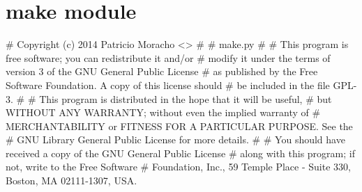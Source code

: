 \documentclass[a4paper,12pt,spanish]{sphinxmanual}
\begin{document}
\section{make module}
\label{\detokenize{make:module-make}}\label{\detokenize{make:make-module}}\label{\detokenize{make::doc}}
\# Copyright (c) 2014 Patricio Moracho \textless{}\textgreater{}
\#
\# make.py
\#
\# This program is free software; you can redistribute it and/or
\# modify it under the terms of version 3 of the GNU General Public License
\# as published by the Free Software Foundation. A copy of this license should
\# be included in the file GPL-3.
\#
\# This program is distributed in the hope that it will be useful,
\# but WITHOUT ANY WARRANTY; without even the implied warranty of
\# MERCHANTABILITY or FITNESS FOR A PARTICULAR PURPOSE.  See the
\# GNU Library General Public License for more details.
\#
\# You should have received a copy of the GNU General Public License
\# along with this program; if not, write to the Free Software
\# Foundation, Inc., 59 Temple Place - Suite 330, Boston, MA 02111-1307, USA.
\end{document}
